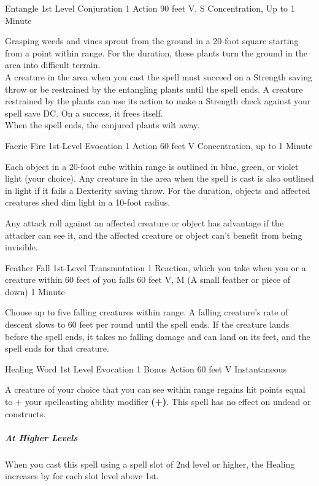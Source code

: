 \documentclass[letterpaper,openany,oneside,twocolumn]{book}
\begin{document}
\DndSpellHeader
  {Entangle}
  {1st Level Conjuration}
  {1 Action}
  {90 feet}
  {V, S}
  {Concentration, Up to 1 Minute}
  
Grasping weeds and vines sprout from the ground in a 20-foot square starting from a point within range. For the duration, these plants turn the ground in the area into difficult terrain.\\
A creature in the area when you cast the spell must succeed on a Strength saving throw or be restrained by the entangling plants until the spell ends. A creature restrained by the plants can use its action to make a Strength check against your spell save DC. On a success, it frees itself.\\
When the spell ends, the conjured plants wilt away.

\DndSpellHeader
  {Faerie Fire}
  {1st-Level Evocation}
  {1 Action}
  {60 feet}
  {V}
  {Concentration, up to 1 Minute}

Each object in a 20-foot cube within range is outlined in blue, green, or violet light (your choice). Any creature in the area when the spell is cast is also outlined in light if it fails a Dexterity saving throw. For the duration, objects and affected creatures shed dim light in a 10-foot radius.

Any attack roll against an affected creature or object has advantage if the attacker can see it, and the affected creature or object can't benefit from being invisible.

\DndSpellHeader
  {Feather Fall}
  {1st-Level Transmutation}
  {1 Reaction, which you take when you or a creature within 60 feet of you falls}
  {60 feet}
  {V, M (A small feather or piece of down)}
  {1 Minute}

Choose up to five falling creatures within range. A falling creature's rate of descent slows to 60 feet per round until the spell ends. If the creature lands before the spell ends, it takes no falling damage and can land on its feet, and the spell ends for that creature.

\DndSpellHeader
  {Healing Word}
  {1st Level Evocation}
  {1 Bonus Action}
  {60 feet}
  {V}
  {Instantaneous}

A creature of your choice that you can see within range regains hit points equal to  + your spellcasting ability modifier \textbf{(+)}. This spell has no effect on undead or constructs.

\subparagraph*{At Higher Levels} When you cast this spell using a spell slot of 2nd level or higher, the Healing increases by  for each slot level above 1st.
\end{document}
